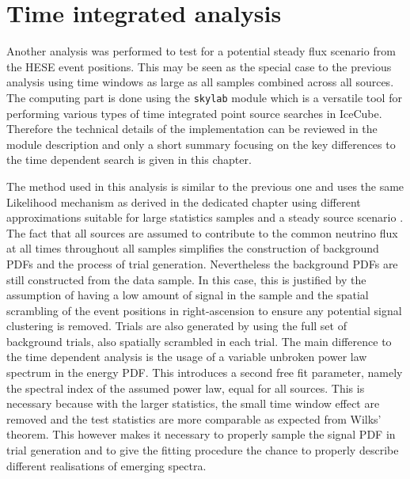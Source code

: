 \chapter{Time integrated analysis}

Another analysis was performed to test for a potential steady flux scenario from the HESE event positions.
This may be seen as the special case to the previous analysis using time windows as large as all samples combined across all sources.
The computing part is done using the \lstinline!skylab!  module which is a versatile tool for performing various types of time integrated point source searches in IceCube.
Therefore the technical details of the implementation can be reviewed in the module description and only a short summary focusing on the key differences to the time dependent search is given in this chapter.


The method used in this analysis is similar to the previous one and uses the same Likelihood mechanism as derived in the dedicated chapter using different approximations suitable for large statistics samples and a steady source scenario .
The fact that all sources are assumed to contribute to the common neutrino flux at all times throughout all samples simplifies the construction of background PDFs and the process of trial generation.
Nevertheless the background PDFs are still constructed from the data sample.
In this case, this is justified by the assumption of having a low amount of signal in the sample and the spatial scrambling of the event positions in right-ascension to ensure any potential signal clustering is removed.
Trials are also generated by using the full set of background trials, also spatially scrambled in each trial.
The main difference to the time dependent analysis is the usage of a variable unbroken power law spectrum in the energy PDF.
This introduces a second free fit parameter, namely the spectral index of the assumed power law, equal for all sources.
This is necessary because with the larger statistics, the small time window effect are removed and the test statistics are more comparable as expected from Wilks' theorem.
This however makes it necessary to properly sample the signal PDF in trial generation and to give the fitting procedure the chance to properly describe different realisations of emerging spectra.

